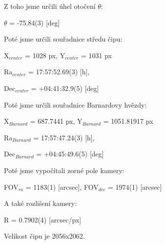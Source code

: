 \documentclass[a4paper,11pt]{article}
\begin{document}
    \begin{minipage}[t]{0.5\textwidth}
                Z toho jsme určili úhel otočení $\theta$:

                \begin{center}
                    $\theta$ = -75.84(3) [deg]
                \end{center}

                \par Poté jsme určili souřadnice středu čipu:

                \begin{center}
                    X$_{center}$ = 1028 px, Y$_{center}$ = 1031 px
                    \vspace{5pt}
                    \par Ra$_{center}$ = 17:57:52.69(3) [h], 
                    \par Dec$_{center}$ = +04:41:32.9(5) [deg]
                \end{center}
                        
                \par Poté jsme určili souřadnice Barnardovy hvězdy: 

                \begin{center}
                    X$_{Barnard}$ = 687.7441 px, Y$_{Barnard}$ = 1051.81917 px
                    \vspace{5pt}
                    \par Ra$_{Barnard}$ = 17:57:47.24(3) [h], 
                    \par Dec$_{Barnard}$ = +04:45:49.6(5) [deg]
                \end{center}
                
                \par Poté jsme vypočítali zorné pole kamery:

                \begin{center}
                    FOV$_{ra}$ = 1183(1) [arcsec], FOV$_{dec}$ = 1974(1) [arcsec]
                \end{center}
                
                \par A také rozlišení kamery: 

                \begin{center}
                    R = 0.7902(4) [arcsec/px]
                \end{center}
                
                \par Velikost čipu je 2056x2062.
                

\end{minipage}
\end{document}
